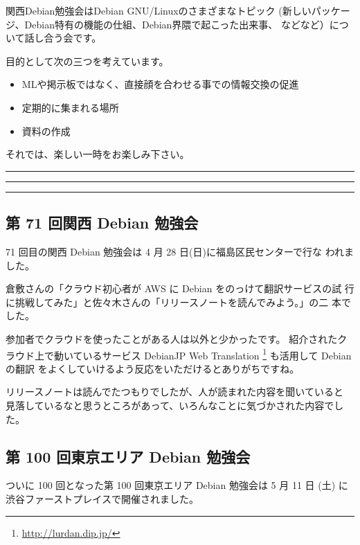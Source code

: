 \documentclass[mingoth,a4paper]{jsarticle}
\begin{document}
 関西Debian勉強会はDebian GNU/Linuxのさまざまなトピック
 (新しいパッケージ、Debian特有の機能の仕組、Debian界隈で起こった出来事、
 などなど）について話し合う会です。

 目的として次の三つを考えています。
 \begin{itemize}
  \item MLや掲示板ではなく、直接顔を合わせる事での情報交換の促進
  \item 定期的に集まれる場所
  \item 資料の作成
 \end{itemize}

 それでは、楽しい一時をお楽しみ下さい。

\newpage

\begin{minipage}[b]{0.2\hsize}
 {}
\end{minipage}
\begin{minipage}[b]{0.8\hsize}
\hrule
\vspace{2mm}
\hrule
\setcounter{tocdepth}{1}
\tableofcontents
\vspace{2mm}
\hrule
\end{minipage}


\subsection{第 71 回関西 Debian 勉強会}

71 回目の関西 Debian 勉強会は 4 月 28 日(日)に福島区民センターで行な
われました。

倉敷さんの「クラウド初心者が AWS に Debian をのっけて翻訳サービスの試
行に挑戦してみた」と佐々木さんの「リリースノートを読んでみよう。」の二
本でした。

参加者でクラウドを使ったことがある人は以外と少かったです。
紹介されたクラウド上で動いているサービス DebianJP Web Translation
\footnote{\url{http://lurdan.dip.jp/}} も活用して Debian の翻訳
をよくしていけるよう反応をいただけるとありがちですね。

リリースノートは読んでたつもりでしたが、人が読まれた内容を聞いていると
見落しているなと思うところがあって、いろんなことに気づかされた内容でし
た。


\subsection{第 100 回東京エリア Debian 勉強会}
ついに 100 回となった第 100 回東京エリア Debian 勉強会は 5 月 11 日
(土) に渋谷ファーストプレイスで開催されました。
\end{document}

